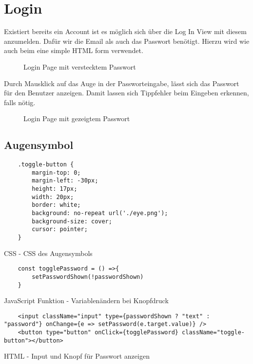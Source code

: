 \pagebreak
\section{Login}
\label{login}

Existiert bereits ein Account ist es möglich sich über die Log In View mit diesem anzumelden. Dafür 
wir die Email als auch das Passwort benötigt. Hierzu wird wie auch beim \underline{} eine 
simple HTML form verwendet. 

\begin{figure}[H]
    \begin{center}
      \caption{Login Page mit verstecktem Passwort}
    \end{center}
\end{figure}

Durch Mausklick auf das Auge in der Passworteingabe, lässt sich das Passwort für den Benutzer
anzeigen. Damit lassen sich Tippfehler beim Eingeben erkennen, falls nötig. 

\begin{figure}[H]
    \begin{center}
      \caption{Login Page mit gezeigtem Passwort}
    \end{center}
\end{figure}

\subsection{Augensymbol}
\begin{code}[htp]
\begin{lstlisting}
    .toggle-button {
        margin-top: 0;
        margin-left: -30px;
        height: 17px;
        width: 20px;
        border: white;
        background: no-repeat url('./eye.png');
        background-size: cover;
        cursor: pointer;
    }
\end{lstlisting}
\caption{CSS -  CSS des Augensymbols}
\end{code}
\begin{code}[htp]
\begin{lstlisting}
    const togglePassword = () =>{
        setPasswordShown(!passwordShown)
    }
\end{lstlisting}
\caption{JavaScript Funktion -  Variablenändern bei Knopfdruck}
\end{code}
\begin{code}[htp]
\begin{lstlisting}
    <input className="input" type={passwordShown ? "text" : "password"} onChange={e => setPassword(e.target.value)} />
    <button type="button" onClick={togglePassword} className="toggle-button"></button>
\end{lstlisting}
\caption{HTML - Input und Knopf für Passwort anzeigen}
\end{code}


